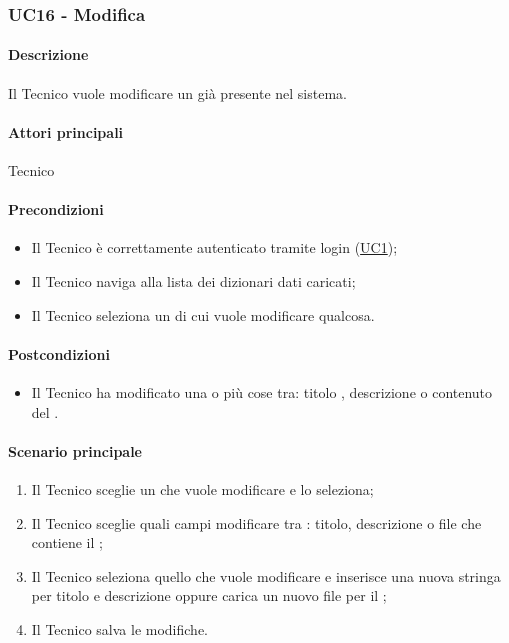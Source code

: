 \subsubsection{UC16 - Modifica }\label{UC16}
\paragraph*{Descrizione}
Il Tecnico vuole modificare un  già presente nel sistema.

\paragraph*{Attori principali}
Tecnico

\paragraph*{Precondizioni}
\begin{itemize}
  \item Il Tecnico è correttamente autenticato tramite login (\hyperref[UC1]{UC1});
  \item Il Tecnico naviga alla lista dei dizionari dati caricati;
  \item Il Tecnico seleziona un  di cui vuole modificare qualcosa.
\end{itemize}

\paragraph*{Postcondizioni}
\begin{itemize}
  \item Il Tecnico ha modificato una o più cose tra: titolo , descrizione o contenuto del .
\end{itemize}

\paragraph*{Scenario principale}
\begin{enumerate}
  \item Il Tecnico sceglie un  che vuole modificare e lo seleziona;
  \item Il Tecnico sceglie quali campi modificare tra : titolo, descrizione o file che contiene il ;
  \item Il Tecnico seleziona quello che vuole modificare e inserisce una nuova stringa per titolo e descrizione oppure carica un nuovo file per il ;
  \item Il Tecnico salva le modifiche.
\end{enumerate}


